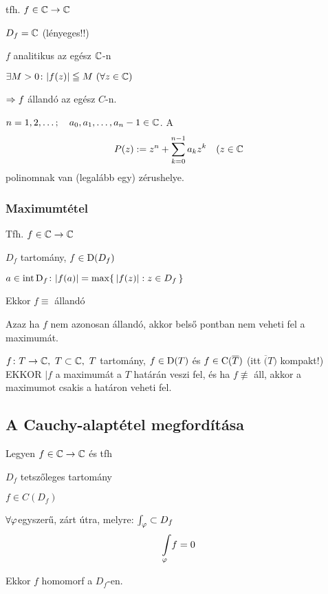 \begin{lemma}[Louville]
  tfh. $f\in\mathbb{C}\to\mathbb{C}$
  \begin{enumzjr}
  \item $D_f = \mathbb{C}$ (lényeges!!)
  \item $f$ analitikus az egész $\mathbb{C}$-n
  \item $\exists M>0\colon |f(z)|\leqq M\ (\forall z\in\C)$
  \end{enumzjr}
  $\Rightarrow f$ állandó az egész $C$-n.
\end{lemma}

\begin{te} $n=1,2,\ldots;\quad a_0,a_1,\dotsc,a_n-1\in\mathbb{C}$. A
  \[ \displaystyle P(z) := z^n + \sum_{k=0}^{n-1}a_k z^k \quad (z\in\mathbb{C} \]
  polinomnak van (legalább egy) zérushelye.
\end{te}


\subsubsection{Maximumtétel}
\begin{te}
  Tfh. $f\in\mathbb{C}\to\mathbb{C}$
  \begin{enumzjr}
  \item $D_f$ tartomány, $f\in\operatorname{D}(D_f)$
  \item $a\in\operatorname{int\,D}_f\colon |f(a)| = \max \{\, |f(z)|: z\in D_f \,\}$
  \end{enumzjr}
  Ekkor $f \equiv$ állandó
\end{te}
\begin{megj}
  Azaz ha $f$ nem azonosan állandó, akkor belső pontban nem veheti fel a maximumát.
\end{megj}
\begin{kov}
  $f\colon T\to \mathbb{C},\ T \subset \mathbb{C},\ T$ tartomány, $f\in\operatorname{D}(T)$ és $f\in \operatorname{C}(\overline{T})$ (itt $\overline(T)$
  kompakt!)\\
  EKKOR $|f$ a maximumát a $T$ határán veszi fel, és ha $f\not\equiv$ áll, akkor a maximumot csakis a határon veheti fel.
\end{kov}

\subsection{A Cauchy-alaptétel megfordítása}
\begin{te}
  Legyen $f\in\mathbb{C}\to\mathbb{C}$ és tfh
  \begin{enumzjr}
  \item $D_f$ tetszőleges tartomány
  \item $f\in C(D_f)$
  \item $\forall \varphi$egyszerű, zárt útra, melyre: $\int_\varphi\subset D_f$
    \[\di\Int_\vfi\! f = 0 \]
  \end{enumzjr}
  Ekkor $f$ homomorf a $D_f$-en.
\end{te}


